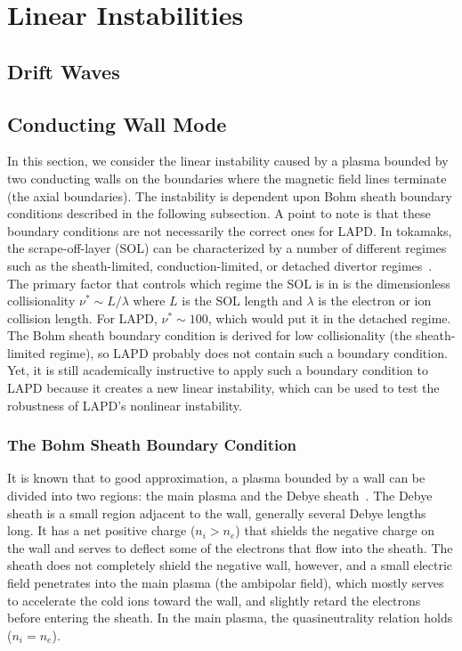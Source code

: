 \chapter{Linear Instabilities}
\label{c_lin_inst}

\section{Drift Waves}
\label{s_drift_waves}

\section{Conducting Wall Mode}
\label{s_cwm}

In this section, we consider the linear instability caused by a plasma bounded by two conducting walls on the boundaries where the magnetic field lines terminate (the axial boundaries).
The instability is dependent upon Bohm sheath boundary conditions described in the following subsection. A point to note is that these boundary conditions are not necessarily the correct ones
for LAPD. In tokamaks, the scrape-off-layer (SOL) can be characterized by a number of different regimes such as the sheath-limited, conduction-limited, 
or detached divertor regimes~\cite{stangeby2000}. The primary factor that controls which regime the SOL is in is the dimensionless collisionality $\nu^* \sim L/\lambda$ where $L$ is the
SOL length and $\lambda$ is the electron or ion collision length. For LAPD, $\nu^* \sim 100$, which would put it in the detached regime. 
The Bohm sheath boundary condition is derived for low collisionality (the sheath-limited regime), so LAPD probably
does not contain such a boundary condition. Yet, it is still academically instructive to apply such a boundary condition to LAPD because it creates a new linear instability, which
can be used to test the robustness of LAPD's nonlinear instability.

\subsection{The Bohm Sheath Boundary Condition}
\label{ss_bohm_sheath}

It is known that to good approximation, a plasma bounded by a wall can be divided into two regions: the main plasma and the Debye sheath~\cite{stangeby2000}. 
The Debye sheath is a small region adjacent to the wall, generally several Debye lengths long. It has a net positive charge ($n_i > n_e$) 
that shields the negative charge on the wall and serves
to deflect some of the electrons that flow into the sheath. The sheath does not completely shield the negative wall, however, and a small electric field penetrates into
the main plasma (the ambipolar field), which mostly serves to accelerate the cold ions toward the wall, and slightly retard the electrons before entering the sheath.
In the main plasma, the quasineutrality relation holds ($n_i = n_e$). 

